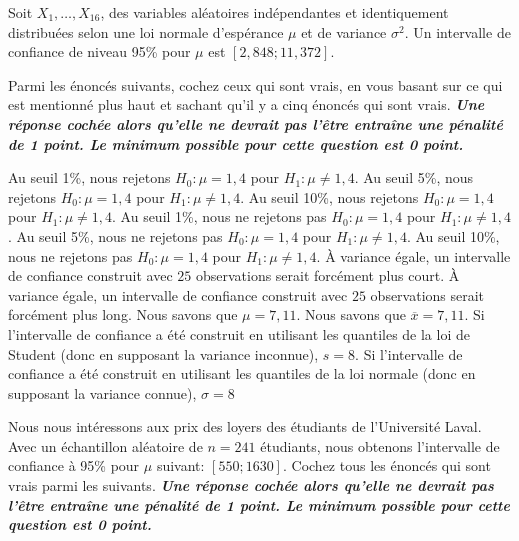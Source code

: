 \begin{questions}
\question[5]\label{QCMicTests}
Soit $X_1,\hdots,X_{16}$, des variables aléatoires indépendantes et identiquement distribuées selon une loi normale d'espérance $\mu$ et de variance $\sigma^2$. Un intervalle de confiance de niveau 95\% pour $\mu$ est $[2,848 ; 11,372]$.

\medskip

Parmi les énoncés suivants, cochez ceux qui sont vrais, en vous basant sur ce qui est mentionné plus haut et sachant qu'il y a cinq énoncés qui sont vrais. \textit{\textbf{Une réponse cochée alors qu'elle ne devrait pas l'être entraîne une pénalité de 1 point. Le minimum possible pour cette question est 0 point.}}
    

\medskip
    \begin{checkboxes}
        \choice Au seuil 1\%, nous rejetons $H_0: \mu=1,4$ pour $H_1:\mu \neq 1,4$.
        \CorrectChoice Au seuil 5\%, nous rejetons $H_0: \mu=1,4$ pour $H_1:\mu \neq 1,4$.
        \correctchoice Au seuil 10\%, nous rejetons $H_0: \mu=1,4$ pour $H_1:\mu \neq 1,4$.
        \choice Au seuil 1\%, nous ne rejetons pas $H_0: \mu=1,4$ pour $H_1:\mu \neq 1,4$.
        \choice Au seuil 5\%, nous ne rejetons pas $H_0: \mu=1,4$ pour $H_1:\mu \neq 1,4$.
        \choice Au seuil 10\%, nous ne rejetons pas $H_0: \mu=1,4$ pour $H_1:\mu \neq 1,4$.
        \correctchoice À variance égale, un intervalle de confiance construit avec $25$ observations serait forcément plus court.
        \choice À variance égale, un intervalle de confiance construit avec $25$ observations serait forcément plus long.
        \choice Nous savons que $\mu=7,11$.
        \correctchoice Nous savons que $\overline{x}=7,11$.
        \correctchoice Si l'intervalle de confiance a été construit en utilisant les quantiles de la loi de Student (donc en supposant la variance inconnue), $s=8$.
        \choice Si l'intervalle de confiance a été construit en utilisant les quantiles de la loi normale (donc en supposant la variance connue), $\sigma =8$
    \end{checkboxes}


\vspace{1cm}

\question [4] Nous nous intéressons aux prix des loyers des étudiants de l'Université Laval. 
Avec un échantillon aléatoire de $n=241$ étudiants, nous obtenons l'intervalle de confiance à 95\%  pour $\mu$ suivant: $[550;1630]$. 
Cochez tous les énoncés qui sont vrais parmi les suivants. \textit{\textbf{Une réponse cochée alors qu'elle ne devrait pas l'être entraîne une pénalité de 1 point. Le minimum possible pour cette question est 0 point.}}
 

\end{questions}
